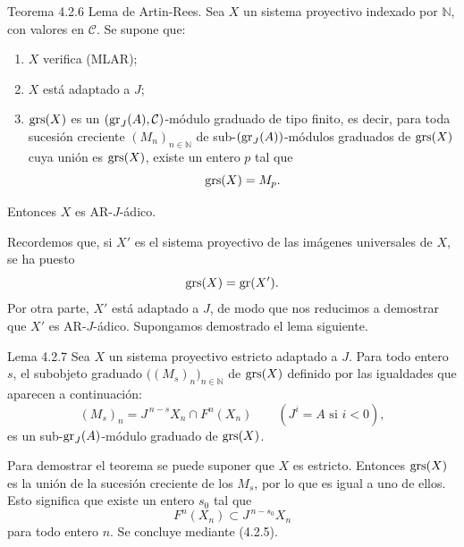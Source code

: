 \begin{statement}{Teorema 4.2.6}
Lema de Artin-Rees. Sea \(X\) un sistema proyectivo indexado por \(\mathbb N\), con valores en \(\mathcal C\). Se supone que:
\begin{enumerate}[label=\textup{(\roman*)}]
\item \(X\) verifica (MLAR);
\item \(X\) está adaptado a \(J\);
\item \(\operatorname{grs}(X)\) es un \((\operatorname{gr}_J(A),\mathcal C)\)-módulo graduado de tipo finito, es decir, para toda sucesión creciente \((M_n)_{n\in\mathbb N}\) de sub-\((\operatorname{gr}_J(A))\)-módulos graduados de \(\operatorname{grs}(X)\) cuya unión es \(\operatorname{grs}(X)\), existe un entero \(p\) tal que
\[
\operatorname{grs}(X)=M_p.
\]
\end{enumerate}
Entonces \(X\) es AR-\(J\)-ádico.
\end{statement}

\begin{prooftext}
Recordemos que, si \(X'\) es el sistema proyectivo de las imágenes universales de \(X\), se ha puesto
\[
\operatorname{grs}(X)=\operatorname{gr}(X').
\]
Por otra parte, \(X'\) está adaptado a \(J\), de modo que nos reducimos a demostrar que \(X'\) es AR-\(J\)-ádico. Supongamos demostrado el lema siguiente.
\end{prooftext}

\begin{statement}{Lema 4.2.7}
Sea \(X\) un sistema proyectivo estricto adaptado a \(J\). Para todo entero \(s\), el subobjeto graduado \(\bigl((M_s)_n\bigr)_{n\in\mathbb N}\) de \(\operatorname{grs}(X)\) definido por las igualdades que aparecen a continuación:
\[
(M_s)_n=J^{\,n-s}X_n\cap F^n(X_n)\qquad(J^i=A\text{ si }i<0),
\]
es un sub-\(\operatorname{gr}_J(A)\)-módulo graduado de \(\operatorname{grs}(X)\).
\end{statement}

Para demostrar el teorema se puede suponer que \(X\) es estricto. Entonces \(\operatorname{grs}(X)\) es la unión de la sucesión creciente de los \(M_s\), por lo que es igual a uno de ellos. Esto significa que existe un entero \(s_0\) tal que
\[
F^n(X_n)\subset J^{\,n-s_0}X_n
\]
para todo entero \(n\). Se concluye mediante (4.2.5).
